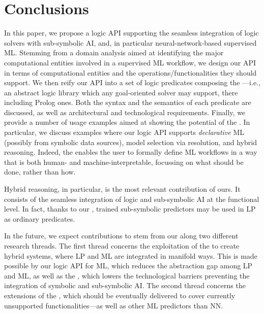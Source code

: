 \documentclass[runningheads]{llncs}
\begin{document}
\section{Conclusions}
\label{sec:conclusions}

In this paper, we propose a logic API supporting the seamless integration of logic solvers with sub-symbolic AI, and, in particular neural-network-based supervised ML.
%
Stemming from a domain analysis aimed at identifying the major computational entities involved in a supervised ML workflow, we design our API in terms of computational entities and the operations/functionalities they should support.
%
We then reify our API into a set of logic predicates composing the \mllib{}---i.e., an abstract logic library which any goal-oriented solver may support, there including Prolog ones.
%
Both the syntax and the semantics of each predicate are discussed, as well as architectural and technological requirements.
%
Finally, we provide a number of usage examples aimed at showing the potential of the \mllib.
%
In particular, we discuss examples where our logic API supports \emph{declarative} ML (possibly from symbolic data sources), model selection via resolution, and hybrid reasoning.
%
Indeed, the \mllib{} enables the user to formally define ML workflows in a way that is both human- and machine-interpretable, focussing on what should be done, rather than how.

Hybrid reasoning, in particular, is the most relevant contribution of ours.
%
It consists of the seamless integration of logic and sub-symbolic AI at the functional level.
%
In fact, thanks to our \mllib{}, trained sub-symbolic predictors may be used in LP as ordinary predicates.


In the future, we expect contributions to stem from our \mllib{} along two different research threads.
%
The first thread concerns the exploitation of the \mllib{} to create hybrid systems, where LP and ML are integrated in manifold ways.
%
This is made possible by our logic API for ML, which reduces the abstraction gap among LP and ML, as well as the \mllib, which lowers the technological barriers preventing the integration of symbolic and sub-symbolic AI.
%
The second thread concerns the extensions of the \mllib{}, which should be eventually delivered to cover currently unsupported functionalities---as well as other ML predictors than NN.
\end{document}
